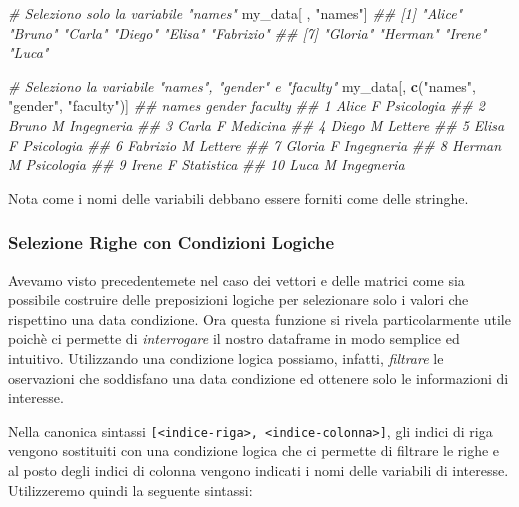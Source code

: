 \documentclass[
]{book}
\newenvironment{Shaded}{\begin{snugshade}}{\end{snugshade}}
\newcommand{\CommentTok}[1]{\textcolor[rgb]{0.56,0.35,0.01}{\textit{#1}}}
\newcommand{\KeywordTok}[1]{\textcolor[rgb]{0.13,0.29,0.53}{\textbf{#1}}}
\newcommand{\NormalTok}[1]{#1}
\newcommand{\StringTok}[1]{\textcolor[rgb]{0.31,0.60,0.02}{#1}}
\begin{document}
\begin{Shaded}
\begin{Highlighting}[]
\CommentTok{# Seleziono solo la variabile "names"}
\NormalTok{my_data[ , }\StringTok{"names"}\NormalTok{]}
\CommentTok{##  [1] "Alice"    "Bruno"    "Carla"    "Diego"    "Elisa"    "Fabrizio"}
\CommentTok{##  [7] "Gloria"   "Herman"   "Irene"    "Luca"}

\CommentTok{# Seleziono la variabile "names", "gender" e "faculty"}
\NormalTok{my_data[, }\KeywordTok{c}\NormalTok{(}\StringTok{"names"}\NormalTok{, }\StringTok{"gender"}\NormalTok{, }\StringTok{"faculty"}\NormalTok{)]}
\CommentTok{##       names gender    faculty}
\CommentTok{## 1     Alice      F Psicologia}
\CommentTok{## 2     Bruno      M Ingegneria}
\CommentTok{## 3     Carla      F   Medicina}
\CommentTok{## 4     Diego      M    Lettere}
\CommentTok{## 5     Elisa      F Psicologia}
\CommentTok{## 6  Fabrizio      M    Lettere}
\CommentTok{## 7    Gloria      F Ingegneria}
\CommentTok{## 8    Herman      M Psicologia}
\CommentTok{## 9     Irene      F Statistica}
\CommentTok{## 10     Luca      M Ingegneria}
\end{Highlighting}
\end{Shaded}

Nota come i nomi delle variabili debbano essere forniti come delle stringhe.

\hypertarget{selezione-righe-con-condizioni-logiche}{%
\subsubsection*{Selezione Righe con Condizioni Logiche}\label{selezione-righe-con-condizioni-logiche}}

Avevamo visto precedentemete nel caso dei vettori e delle matrici come sia possibile costruire delle preposizioni logiche per selezionare solo i valori che rispettino una data condizione. Ora questa funzione si rivela particolarmente utile poichè ci permette di \emph{interrogare} il nostro dataframe in modo semplice ed intuitivo. Utilizzando una condizione logica possiamo, infatti, \emph{filtrare} le oservazioni che soddisfano una data condizione ed ottenere solo le informazioni di interesse.

Nella canonica sintassi \texttt{{[}\textless{}indice-riga\textgreater{},\ \textless{}indice-colonna\textgreater{}{]}}, gli indici di riga vengono sostituiti con una condizione logica che ci permette di filtrare le righe e al posto degli indici di colonna vengono indicati i nomi delle variabili di interesse. Utilizzeremo quindi la seguente sintassi:
\end{document}
